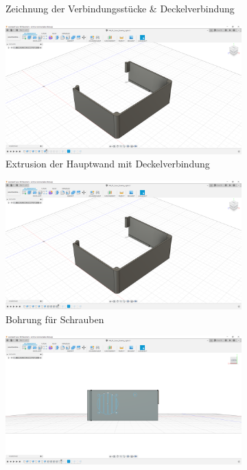 \begin{figure}[H]
\begin{subfigure}[t]{.3\linewidth}
		\caption[Zeichnung der Verbindungsstücke \& Deckelverbindung]{Zeichnung der Verbindungsstücke \& Deckelverbindung}
		\label{fig:design-right-06}
	\end{subfigure}
	\begin{subfigure}[t]{.3\linewidth}
		\includegraphics[width=\linewidth]{img/konstruktion_gehaeuse_rechts_007.png}
		\caption[Extrusion der Hauptwand mit Deckelverbindung]{Extrusion der Hauptwand mit Deckelverbindung}
		\label{fig:design-right-07}
	\end{subfigure}
	\begin{subfigure}[t]{.3\linewidth}
		\includegraphics[width=\linewidth]{img/konstruktion_gehaeuse_rechts_008.png}
		\caption[Bohrung für Schrauben]{Bohrung für Schrauben}
		\label{fig:design-right-08}
	\end{subfigure}
	\begin{subfigure}[t]{.3\linewidth}
		\includegraphics[width=\linewidth]{img/konstruktion_gehaeuse_rechts_009.png}

\end{subfigure}
\end{figure}
